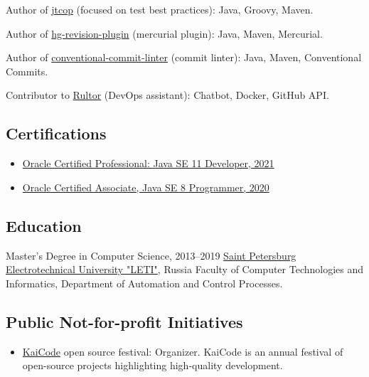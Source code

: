 \documentclass{vl}
\begin{document}
    Author of  \href{https://github.com/volodya-lombrozo/jtcop}{jtcop} (focused on test best practices):
    Java, Groovy, Maven.

    Author of \href{https://github.com/volodya-lombrozo/hg-revision-plugin}{hg-revision-plugin} (mercurial plugin):
    Java, Maven, Mercurial.

    Author of \href{https://github.com/volodya-lombrozo/conventional-commit-linter}{conventional-commit-linter} (commit linter):
    Java, Maven, Conventional Commits.

    Contributor to \href{https://www.rultor.com}{Rultor} (DevOps assistant):
    Chatbot, Docker, GitHub API.

    \subsection*{Certifications}

    \begin{itemize}
        \item \href{https://catalog-education.oracle.com/pls/certview/sharebadge?id=87F6A2FE819A5A5AF4120A05900AB28A461EE9A3EE9FBFA02721FADAEB3BCE19}{Oracle Certified Professional: Java SE 11 Developer, 2021}
        \item \href{https://www.credly.com/badges/e2d9ddda-20dc-433d-8ab7-18548fd0fd8f/public_url}{Oracle Certified Associate, Java SE 8 Programmer, 2020}
    \end{itemize}

    \subsection*{Education}

    \begin{samepage}
        Master's Degree in Computer Science, 2013--2019\newline
        \href{https://etu.ru/en/university/}{Saint Petersburg Electrotechnical University "LETI"}, Russia\newline
        Faculty of Computer Technologies and Informatics, Department of Automation and Control Processes.
    \end{samepage}

    \subsection*{Public Not-for-profit Initiatives}
    \begin{itemize}
        \item \href{https://www.kaicode.org}{KaiCode} open source festival: Organizer.
        KaiCode is an annual festival of open-source projects highlighting high-quality development.
    \end{itemize}
\end{document}
